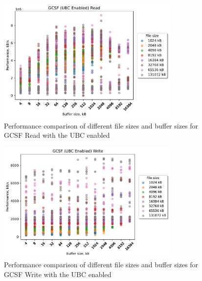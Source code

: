 \begin{figure}[!htb]
	\label{fig:bench_gcsf_ubc_scatter_read}
	\begin{center}
		\includegraphics[width=0.8\textwidth]{figures.nosync/benchmarking/GCSF/scatter-UBC Enabled-Read.pdf}
	\end{center}
	\caption[Comparison of Read performance for file size and buffer size for GCSF with the UBC enabled]{Performance comparison of different file sizes and buffer sizes for GCSF Read with the UBC enabled}
\end{figure}
\begin{figure}[!htb]
	\label{fig:bench_gcsf_ubc_scatter_write}
	\begin{center}
		\includegraphics[width=0.8\textwidth]{figures.nosync/benchmarking/GCSF/scatter-UBC Enabled-Write.pdf}
	\end{center}
	\caption[Comparison of Write performance for file size and buffer size for GCSF with the UBC enabled]{Performance comparison of different file sizes and buffer sizes for GCSF Write with the UBC enabled}
\end{figure}
\clearpage
